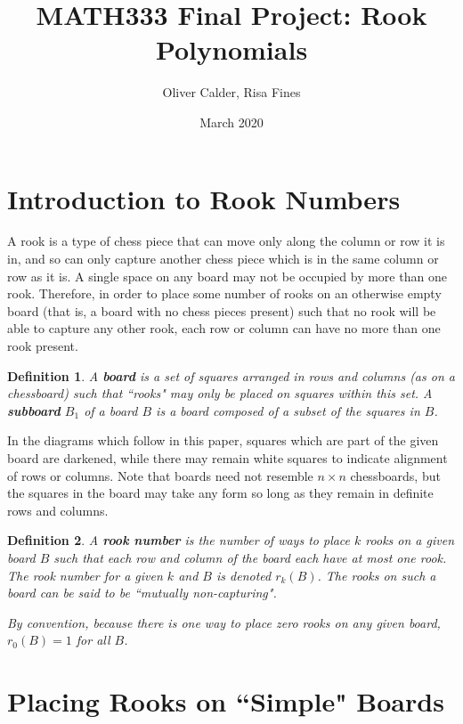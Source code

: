 \documentclass{article}
\title{MATH333 Final Project: Rook Polynomials}
\author{Oliver Calder, Risa Fines}
\date{March 2020}
\newtheorem{definition}{Definition}
\begin{document}
\maketitle

\section{Introduction to Rook Numbers} \label{intro}
A rook is a type of chess piece that can move only along the column or row it is in, and so can only capture another chess piece which is in the same column or row as it is. A single space on any board may not be occupied by more than one rook. Therefore, in order to place some number of rooks on an otherwise empty board (that is, a board with no chess pieces present) such that no rook will be able to capture any other rook, each row or column can have no more than one rook present.

\begin{definition} A \textbf{board} is a set of squares arranged in rows and columns (as on a chessboard) such that ``rooks" may only be placed on squares within this set. A \textbf{subboard} $B_1$ of a board $B$ is a board composed of a subset of the squares in $B$.
\end{definition}

In the diagrams which follow in this paper, squares which are part of the given board are darkened, while there may remain white squares to indicate alignment of rows or columns. Note that boards need not resemble $n \times n$ chessboards, but the squares in the board may take any form so long as they remain in definite rows and columns.

\begin{definition}
    A \textbf{rook number} is the number of ways to place $k$ rooks on a given board $B$ such that each row and column of the board each have at most one rook. The rook number for a given $k$ and $B$ is denoted $r_k(B)$. The rooks on such a board can be said to be ``mutually non-capturing".
    
    By convention, because there is one way to place zero rooks on any given board, $r_0(B)= 1$ for all $B$.
\end{definition}


\section{Placing Rooks on ``Simple" Boards} \label{simple}
\end{document}
